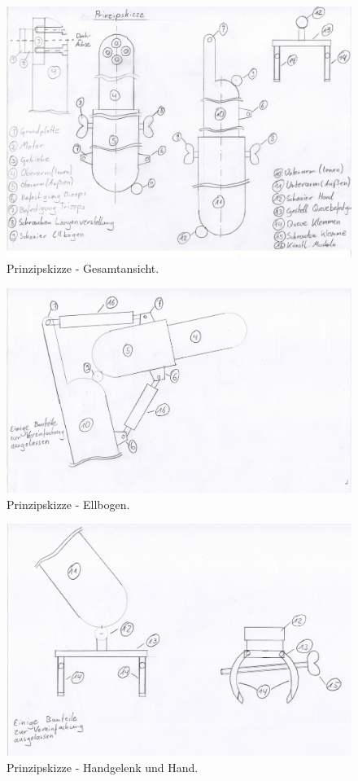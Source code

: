 	\begin{figure}[h]
		\centering
		\includegraphics[width=\textwidth]{"Abb/Prinzipskizze Gesamtansicht"}
		\caption[Prinzipskizze - Gesamtansicht]{Prinzipskizze - Gesamtansicht.}
		\label{fig:prinzipskizze-gesamtansicht}
	\end{figure}

	\begin{figure}[h]
		\centering
		\includegraphics[width=\textwidth]{"Abb/Prinzipskizze Ellbogen"}
		\caption[Prinzipskizze - Ellbogen]{Prinzipskizze - Ellbogen.}
		\label{fig:prinzipskizze-ellbogen}
	\end{figure}

	\begin{figure}[h]
		\centering
		\includegraphics[width=\textwidth]{"Abb/Prinzipskizze Handgelenk und Hand"}
		\caption[Prinzipskizze - Handgelenk und Hand]{Prinzipskizze - Handgelenk und Hand.}
		\label{fig:prinzipskizze-handgelenk-und-hand}
	\end{figure}